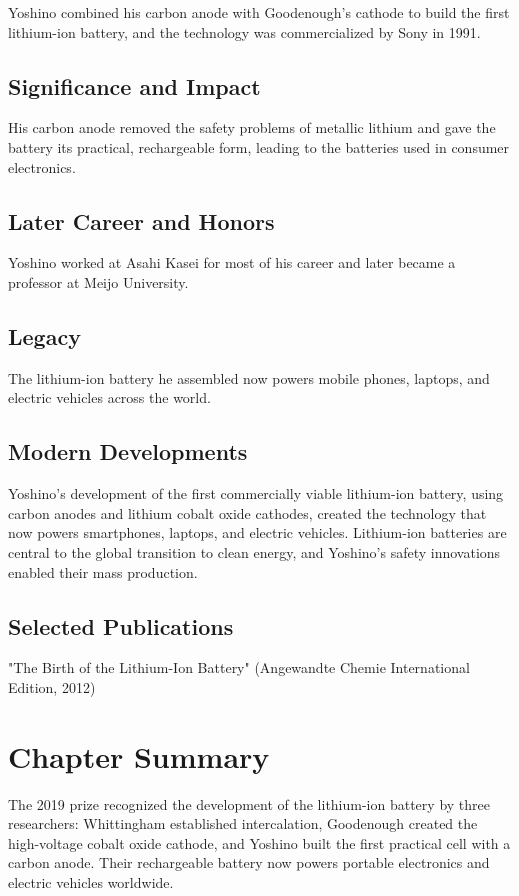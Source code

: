 Yoshino combined his carbon anode with Goodenough's cathode to build the first lithium-ion battery, and the technology was commercialized by Sony in 1991.

\subsection*{Significance and Impact}

His carbon anode removed the safety problems of metallic lithium and gave the battery its practical, rechargeable form, leading to the batteries used in consumer electronics.

\subsection*{Later Career and Honors}

Yoshino worked at Asahi Kasei for most of his career and later became a professor at Meijo University.

\subsection*{Legacy}

The lithium-ion battery he assembled now powers mobile phones, laptops, and electric vehicles across the world.

\subsection*{Modern Developments}

Yoshino's development of the first commercially viable lithium-ion battery, using carbon anodes and lithium cobalt oxide cathodes, created the technology that now powers smartphones, laptops, and electric vehicles. Lithium-ion batteries are central to the global transition to clean energy, and Yoshino's safety innovations enabled their mass production.

\subsection*{Selected Publications}

"The Birth of the Lithium-Ion Battery" (Angewandte Chemie International Edition, 2012)

\clearpage

\section*{Chapter Summary}

The 2019 prize recognized the development of the lithium-ion battery by three researchers: Whittingham established intercalation, Goodenough created the high-voltage cobalt oxide cathode, and Yoshino built the first practical cell with a carbon anode. Their rechargeable battery now powers portable electronics and electric vehicles worldwide.
